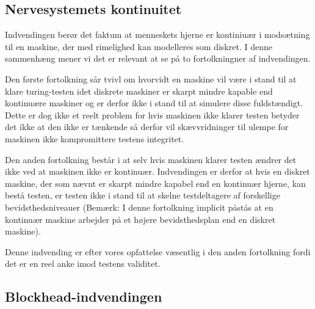 \documentclass{article}
\begin{document}
\subsection{Nervesystemets kontinuitet}

Indvendingen berør det faktum at menneskets hjerne er kontiniuær i modsætning til en maskine, der med rimelighed kan modelleres som diskret. I denne sammenhæng mener vi det er relevant at se på to fortolkningner af indvendingen.

Den første fortolkning sår tvivl om hvorvidt en maskine vil være i stand til at klare turing-testen idet diskrete maskiner er skarpt mindre kapable end kontinuære maskiner og er derfor ikke i stand til at simulere disse fuldstændigt. Dette er dog ikke et reelt problem for hvis maskinen ikke klarer testen betyder det ikke at den ikke er tænkende så derfor vil skævvridninger til ulempe for maskinen ikke kompromittere testens integritet.

Den anden fortolkning består i at selv hvis maskinen klarer testen ændrer det ikke ved at maskinen ikke er kontinuær. Indvendingen er derfor at hvis en diskret maskine, der som nævnt er skarpt mindre kapabel end en kontinuær hjerne, kan bestå testen, er testen ikke i stand til at skelne testdeltagere af forskellige bevidsthedsniveauer (Bemærk: I denne fortolkning implicit påstås at en kontinuær maskine arbejder på et højere bevidsthedsplan end en diskret maskine).

Denne indvending er efter vores opfattelse væsentlig i den anden fortolkning fordi det er en reel anke imod testens validitet.


\subsection{Blockhead-indvendingen}
\end{document}
